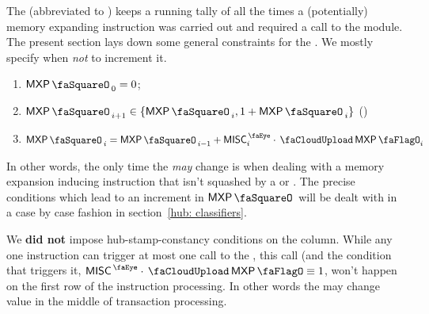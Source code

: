 The \mxpSTAMP{} (abbreviated to \mxpStamp{}) keeps a running tally of all the times a (potentially) memory expanding instruction was carried out and required a call to the \mxpMod{} module. The present section lays down some general constraints for the \mxpStamp{}. We mostly specify when \emph{not} to increment it.
\begin{enumerate}
	\item $\mxpStamp_{0} = 0$;
	\item $\mxpStamp_{i + 1} \in \{ \mxpStamp_{i}, 1 + \mxpStamp_{i} \}$ (\trash)
	\item $\mxpStamp_{i} = \mxpStamp_{i - 1} + \peekMisc_{i} \cdot \miscMxpFlag_{i}$
\end{enumerate}
In other words, the only time the \mxpStamp{} \emph{may} change is when dealing with a memory expansion inducing instruction that isn't squashed by a \suxSH{} or \soxSH{}. The precise conditions which lead to an increment in $\mxpStamp$ will be dealt with in a case by case fashion in section~\ref{hub: classifiers}.

\saNote{}
We \textbf{did not} impose hub-stamp-constancy conditions on the \mxpStamp{} column.
While any one instruction can trigger at most one call to the \mxpMod{}, this call (and the condition that triggers it, $\peekMisc \cdot \miscMxpFlag \equiv 1$, won't happen on the first row of the instruction processing.
In other words the \mxpStamp{} may change value in the middle of transaction processing.
